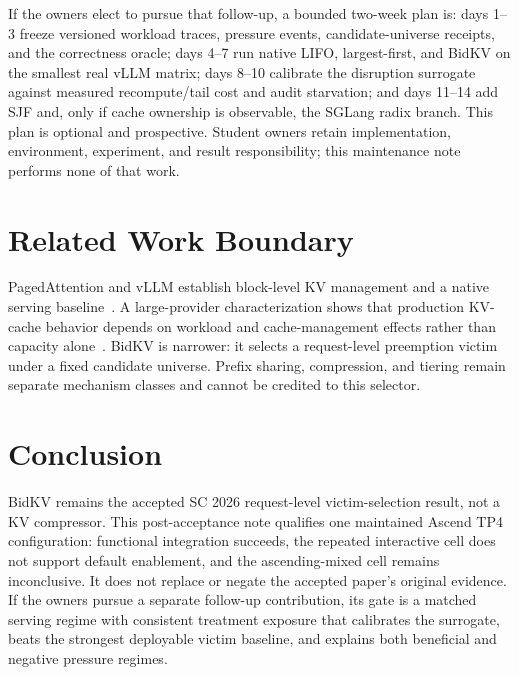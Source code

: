 \documentclass[10pt,twocolumn]{article}
\begin{document}
If the owners elect to pursue that follow-up, a bounded two-week plan is: days 1--3 freeze versioned workload traces, pressure events, candidate-universe receipts, and the correctness oracle; days 4--7 run native LIFO, largest-first, and BidKV on the smallest real vLLM matrix; days 8--10 calibrate the disruption surrogate against measured recompute/tail cost and audit starvation; and days 11--14 add SJF and, only if cache ownership is observable, the SGLang radix branch. This plan is optional and prospective. Student owners retain implementation, environment, experiment, and result responsibility; this maintenance note performs none of that work.

\balance
\section{Related Work Boundary}
PagedAttention and vLLM establish block-level KV management and a native serving baseline~\cite{kwon2023pagedattention}. A large-provider characterization shows that production KV-cache behavior depends on workload and cache-management effects rather than capacity alone~\cite{wang2025kvcache}. BidKV is narrower: it selects a request-level preemption victim under a fixed candidate universe. Prefix sharing, compression, and tiering remain separate mechanism classes and cannot be credited to this selector.

\section{Conclusion}
BidKV remains the accepted SC 2026 request-level victim-selection result, not a KV compressor. This post-acceptance note qualifies one maintained Ascend TP4 configuration: functional integration succeeds, the repeated interactive cell does not support default enablement, and the ascending-mixed cell remains inconclusive. It does not replace or negate the accepted paper's original evidence. If the owners pursue a separate follow-up contribution, its gate is a matched serving regime with consistent treatment exposure that calibrates the surrogate, beats the strongest deployable victim baseline, and explains both beneficial and negative pressure regimes.



\end{document}
